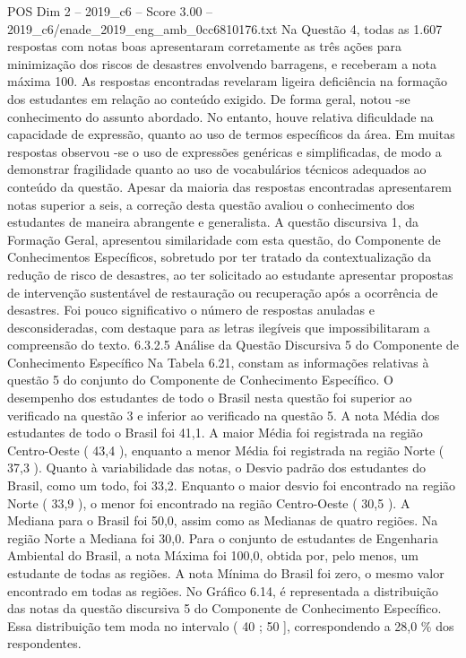 \begin{textsample}{POS Dim 2 – 2019\_c6 – Score 3.00 – 2019\_c6/enade\_2019\_eng\_amb\_0cc6810176.txt}
Na Questão 4, todas as 1.607 respostas com notas boas apresentaram corretamente as três ações para minimização dos riscos de desastres envolvendo barragens, e receberam a nota máxima 100.
As respostas encontradas revelaram ligeira deficiência na formação dos estudantes em relação ao conteúdo exigido.
De forma geral, notou -se conhecimento do assunto abordado.
No entanto, houve relativa dificuldade na capacidade de expressão, quanto ao uso de termos específicos da área.
Em muitas respostas observou -se o uso de expressões genéricas e simplificadas, de modo a demonstrar fragilidade quanto ao uso de vocabulários técnicos adequados ao conteúdo da questão.
Apesar da maioria das respostas encontradas apresentarem notas superior a seis, a correção desta questão avaliou o conhecimento dos estudantes de maneira abrangente e generalista.
A questão discursiva 1, da Formação Geral, apresentou similaridade com esta questão, do Componente de Conhecimentos Específicos, sobretudo por ter tratado da contextualização da redução de risco de desastres, ao ter solicitado ao estudante apresentar propostas de intervenção sustentável de restauração ou recuperação após a ocorrência de desastres.
Foi pouco significativo o número de respostas anuladas e desconsideradas, com destaque para as letras ilegíveis que impossibilitaram a compreensão do texto. 6.3.2.5 Análise da Questão Discursiva 5 do Componente de Conhecimento Específico Na Tabela 6.21, constam as informações relativas à questão 5 do conjunto do Componente de Conhecimento Específico.
O desempenho dos estudantes de todo o Brasil nesta questão foi superior ao verificado na questão 3 e inferior ao verificado na questão 5.
A nota Média dos estudantes de todo o Brasil foi 41,1.
A maior Média foi registrada na região Centro-Oeste ( 43,4 ), enquanto a menor Média foi registrada na região Norte ( 37,3 ).
Quanto à variabilidade das notas, o Desvio padrão dos estudantes do Brasil, como um todo, foi 33,2.
Enquanto o maior desvio foi encontrado na região Norte ( 33,9 ), o menor foi encontrado na região Centro-Oeste ( 30,5 ).
A Mediana para o Brasil foi 50,0, assim como as Medianas de quatro regiões.
Na região Norte a Mediana foi 30,0.
Para o conjunto de estudantes de Engenharia Ambiental do Brasil, a nota Máxima foi 100,0, obtida por, pelo menos, um estudante de todas as regiões.
A nota Mínima do Brasil foi zero, o mesmo valor encontrado em todas as regiões.
No Gráfico 6.14, é representada a distribuição das notas da questão discursiva 5 do Componente de Conhecimento Específico.
Essa distribuição tem moda no intervalo ( 40 ; 50 ], correspondendo a 28,0 \% dos respondentes.

\end{textsample}
